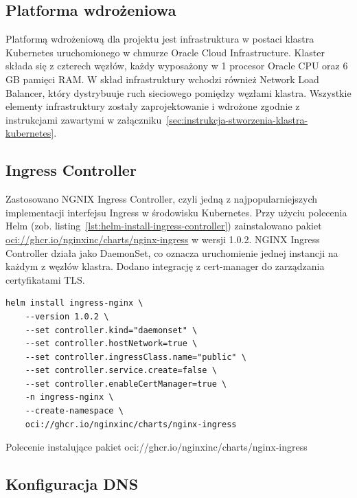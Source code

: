 \subsection{Platforma wdrożeniowa}\label{subsec:platforma-wdrozeniowa-kubernetes}

Platformą wdrożeniową dla projektu jest infrastruktura w postaci klastra Kubernetes uruchomionego w chmurze Oracle Cloud Infrastructure.
Klaster składa się z czterech węzłów, każdy wyposażony w 1 procesor Oracle CPU oraz 6 GB pamięci RAM\@.
W skład infrastruktury wchodzi również Network Load Balancer, który dystrybuuje ruch sieciowego pomiędzy węzłami klastra.
Wszystkie elementy infrastruktury zostały zaprojektowanie i wdrożone zgodnie z instrukcjami zawartymi w załączniku~\ref{sec:instrukcja-stworzenia-klastra-kubernetes}.

\subsection{Ingress Controller}\label{subsec:ingress-controller}

Zastosowano NGNIX Ingress Controller, czyli jedną z najpopularniejszych implementacji interfejsu Ingress w środowisku Kubernetes.
Przy użyciu polecenia Helm (zob. listing~\ref{lst:helm-install-ingress-controller}) zainstalowano pakiet \url{oci://ghcr.io/nginxinc/charts/nginx-ingress} w wersji 1.0.2.
NGINX Ingress Controller działa jako DaemonSet, co oznacza uruchomienie jednej instancji na każdym z węzłów klastra.
Dodano integrację z cert-manager do zarządzania certyfikatami TLS\@.

\begin{listing}[H]
    \begin{verbatim}
helm install ingress-nginx \
    --version 1.0.2 \
    --set controller.kind="daemonset" \
    --set controller.hostNetwork=true \
    --set controller.ingressClass.name="public" \
    --set controller.service.create=false \
    --set controller.enableCertManager=true \
    -n ingress-nginx \
    --create-namespace \
    oci://ghcr.io/nginxinc/charts/nginx-ingress
    \end{verbatim}
    \caption{Polecenie instalujące pakiet oci://ghcr.io/nginxinc/charts/nginx-ingress}
    \label{lst:helm-install-ingress-controller}
\end{listing}

\newpage

\subsection{Konfiguracja DNS}\label{subsec:konfiguracja-dns}


